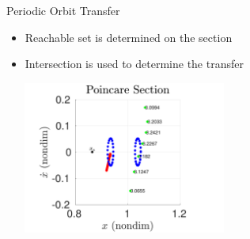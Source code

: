 \begin{frame}{Periodic Orbit Transfer}
    \begin{itemize}
        \item Reachable set is determined on the \Poincare section
        \item Intersection is used to determine the transfer
    \end{itemize}
    \begin{center}
        ~
        ~
        \includegraphics[width=0.5\textwidth]{figures/2017_JAS/poincare_compare} 
    \end{center}
\end{frame}

